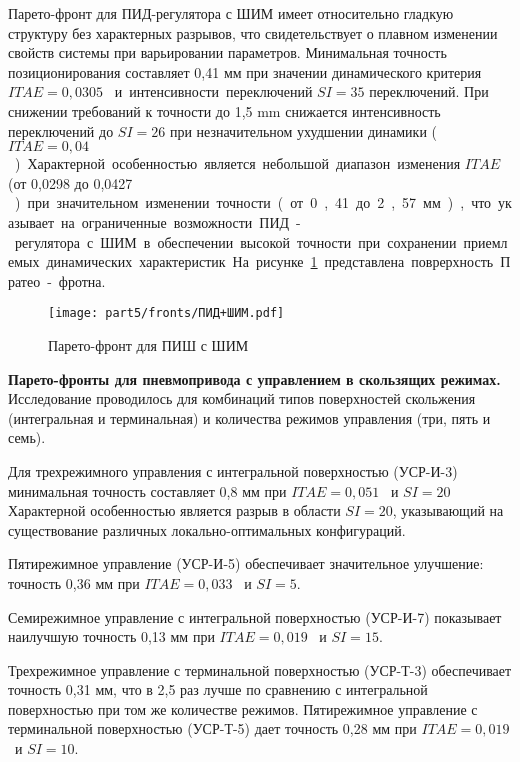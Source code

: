 Парето-фронт для ПИД-регулятора с ШИМ имеет относительно гладкую структуру без характерных
разрывов, что свидетельствует о плавном изменении свойств системы при варьировании параметров.
Минимальная точность позиционирования составляет 0,41 мм при значении динамического критерия $ITAE = 0,0305$ \si{\metre\per\second\square}
и интенсивности переключений $SI = 35$ переключений. При снижении требований к точности до 1,5 \si{\milli\metre} снижается
интенсивность переключений до $SI = 26$ при незначительном ухудшении динамики ($ITAE = 0,04$ \si{\metre\per\second\square}).

Характерной особенностью является небольшой диапазон изменения $ITAE$ (от 0,0298 до 0,0427 \si{\metre\per\second\square}) при значительном изменении
точности (от 0,41 до 2,57 мм), что указывает на ограниченные возможности ПИД-регулятора с ШИМ в
обеспечении высокой точности при сохранении приемлемых динамических характеристик.
На рисунке \ref{fig:pid_pareto} представлена поврерхность Пратео-фротна.
\begin{figure}[h]
	\centering
	\texttt{[image: part5/fronts/ПИД+ШИМ.pdf]}
	\caption{Парето-фронт для ПИШ с ШИМ}
	\label{fig:pid_pareto}
\end{figure}

\textbf{Парето-фронты для пневмопривода с управлением в скользящих режимах.}
Исследование проводилось для комбинаций типов поверхностей скольжения (интегральная и терминальная)
и количества режимов управления (три, пять и семь).

Для трехрежимного управления с интегральной поверхностью (УСР-И-3) минимальная
точность составляет 0,8 мм при $ITAE = 0,051$ \si{\metre\per\second\square} и $SI = 20$
Характерной особенностью является разрыв в области $SI = 20$, указывающий на существование различных локально-оптимальных конфигураций.

Пятирежимное управление (УСР-И-5) обеспечивает значительное
улучшение: точность 0,36 мм при $ITAE = 0,033$ \si{\metre\per\second\square} и $SI = 5$.

Семирежимное управление с интегральной поверхностью (УСР-И-7) показывает
наилучшую точность 0,13 мм при $ITAE = 0,019$ \si{\metre\per\second\square} и $SI = 15$.

Трехрежимное управление с терминальной поверхностью (УСР-Т-3)
обеспечивает точность 0,31 мм, что в 2,5 раз лучше по сравнению с
интегральной поверхностью при том же количестве режимов. Пятирежимное
управление с терминальной поверхностью (УСР-Т-5) дает точность 0,28 мм при $ITAE = 0,019$
\si{\metre\per\second\square} и $SI = 10$.

